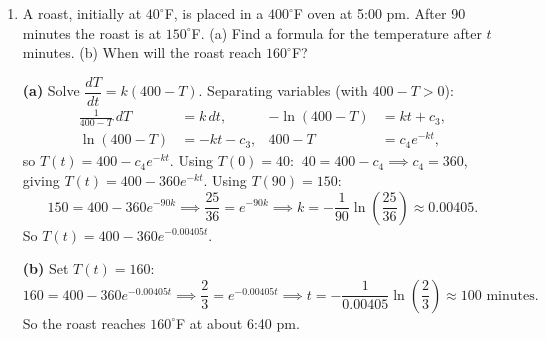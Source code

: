 \documentclass[10pt]{article}
\begin{document}
\begin{enumerate}[leftmargin=*, label=\numbox{\arabic*}, resume]
\item
    \begin{problem}[7cm]
        A roast, initially at \(40^\circ\)F, is placed in a \(400^\circ\)F oven at 5:00 pm. After
        90 minutes the roast is at \(150^\circ\)F.
        (a) Find a formula for the temperature after \(t\) minutes.
        (b) When will the roast reach \(160^\circ\)F?
    \end{problem}
    \begin{solution}
        \textbf{(a)} Solve \(\dfrac{dT}{dt} = k(400 - T)\). Separating variables (with \(400 - T > 0\)):
        \[
        \begin{aligned}
            \frac{1}{400 - T}\,dT &= k\,dt, &
            -\ln(400 - T) &= kt + c_3, \\
            \ln(400 - T) &= -kt - c_3, &
            400 - T &= c_4 e^{-kt},
        \end{aligned}
        \]
        so \(T(t) = 400 - c_4 e^{-kt}\). Using \(T(0) = 40\):
        \(\ 40 = 400 - c_4 \implies c_4 = 360\), giving \(T(t) = 400 - 360 e^{-kt}\).
        Using \(T(90) = 150\):
        \[
            150 = 400 - 360 e^{-90k}
            \implies \frac{25}{36} = e^{-90k}
            \implies k = -\frac{1}{90}\ln\!\left(\frac{25}{36}\right) \approx 0.00405.
        \]
        So \(T(t) = 400 - 360 e^{-0.00405 t}\).

        \textbf{(b)} Set \(T(t) = 160\):
        \[
            160 = 400 - 360 e^{-0.00405 t}
            \implies \frac{2}{3} = e^{-0.00405 t}
            \implies t = -\frac{1}{0.00405}\ln\!\left(\frac{2}{3}\right) \approx 100 \text{ minutes.}
        \]
        So the roast reaches \(160^\circ\)F at about 6:40 pm.
    \end{solution}

\end{enumerate}
\end{document}
